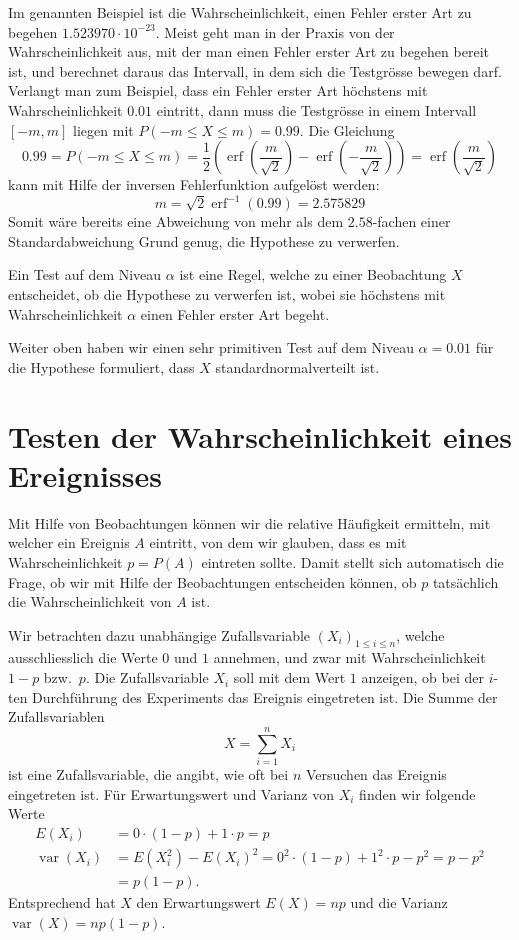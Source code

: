 Im genannten Beispiel ist die Wahrscheinlichkeit, einen Fehler erster
Art zu begehen $1.523970\cdot 10^{-23}$.
Meist geht man in der Praxis von der
Wahrscheinlichkeit aus, mit der man einen Fehler erster Art zu begehen
bereit ist, und berechnet daraus das Intervall, in dem sich die
Testgrösse bewegen darf.
Verlangt man zum Beispiel, dass ein Fehler erster
Art höchstens mit Wahrscheinlichkeit $0.01$ eintritt, dann muss die 
Testgrösse in einem Intervall $[-m,m]$ liegen mit $P(-m\le X\le m)=0.99$.
Die Gleichung
\[
0.99 = P(-m\le X\le m)
=\frac12\left(\operatorname{erf}(\frac{m}{\sqrt{2}})-\operatorname{erf}(-\frac{m}{\sqrt{2}})\right)
=\operatorname{erf}(\frac{m}{\sqrt{2}})
\]
kann mit Hilfe der inversen Fehlerfunktion aufgelöst werden:
\[
m=\sqrt{2}\operatorname{erf}^{-1}(0.99)=2.575829
\]
Somit wäre bereits eine Abweichung von mehr als dem $2.58$-fachen einer
Standardabweichung Grund genug, die Hypothese zu verwerfen.

\begin{definition}
Ein Test auf dem Niveau $\alpha$ ist eine Regel, welche zu einer
Beobachtung $X$ entscheidet, ob die Hypothese zu verwerfen ist, wobei
sie höchstens mit Wahrscheinlichkeit $\alpha$ einen Fehler erster
Art begeht.
\end{definition}

Weiter oben haben wir einen sehr primitiven Test auf dem Niveau
$\alpha=0.01$ für die
Hypothese formuliert, dass $X$ standardnormalverteilt ist.

\section{Testen der Wahrscheinlichkeit eines Ereignisses}
Mit Hilfe von Beobachtungen können wir die relative Häufigkeit ermitteln, mit
welcher ein Ereignis $A$ eintritt, von dem wir glauben, dass es mit
Wahrscheinlichkeit $p=P(A)$ eintreten sollte.
Damit stellt sich automatisch die Frage, ob wir mit Hilfe der
Beobachtungen entscheiden können, ob $p$ tatsächlich die Wahrscheinlichkeit
von $A$ ist.

Wir betrachten dazu unabhängige Zufallsvariable $(X_i)_{1\le i\le n}$,
welche ausschliesslich
die Werte $0$ und $1$ annehmen, und zwar mit Wahrscheinlichkeit
$1-p$ bzw.~$p$.
Die Zufallsvariable $X_i$ soll mit dem Wert $1$ anzeigen,
ob bei der $i$-ten Durchführung des Experiments das Ereignis eingetreten ist.
Die Summe der Zufallsvariablen 
\[
X=\sum_{i=1}^nX_i
\]
ist eine Zufallsvariable, die angibt, wie oft bei $n$ Versuchen das Ereignis
eingetreten ist.
Für Erwartungswert und Varianz von $X_i$ finden
wir folgende Werte
\begin{align*}
E(X_i)
&=
0\cdot (1-p)+1\cdot p=p
\\
\operatorname{var}(X_i)
&=
E(X_i^2)-E(X_i)^2=0^2\cdot (1-p)+1^2\cdot p-p^2 =p-p^2
\\
&=
p(1-p).
\end{align*}
Entsprechend hat $X$ den Erwartungswert $E(X)=np$ und
die Varianz $\operatorname{var}(X)=np(1-p)$.

